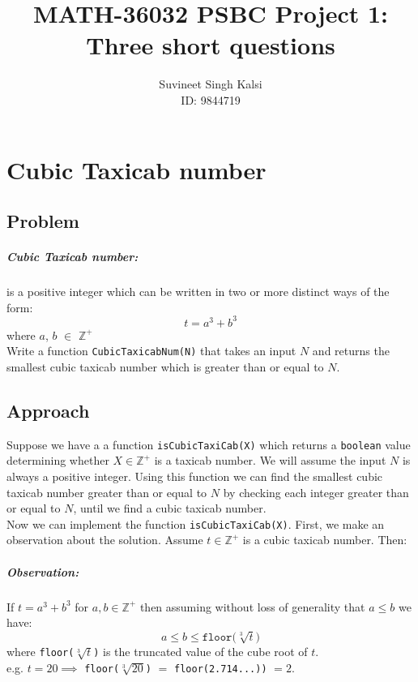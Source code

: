 \documentclass[11pt]{report}
\title{MATH-36032 PSBC Project 1: Three short questions}
\author{Suvineet Singh Kalsi \\ ID: 9844719}
\date{}
\begin{document}
\maketitle

\chapter{Cubic Taxicab number}

\section*{Problem}
\paragraph{Cubic Taxicab number:}
is a positive integer which can be written in two or more distinct ways of the form:
\begin{equation*}
	t = a^3 + b^3
\end{equation*} where $a$, $b$ $\in$ $\mathbb{Z^+}$ \\

Write a function \texttt{CubicTaxicabNum(N)} that takes an input $N$ and returns the smallest cubic taxicab number which is greater than or equal to $N$.

\section{Approach}
Suppose we have a a function \texttt{isCubicTaxiCab(X)} which returns a \texttt{boolean} value determining whether $X \in \mathbb{Z^+}$ is a taxicab number. We will assume the input $N$ is always a positive integer. Using this function we can find the smallest cubic taxicab number greater than or equal to $N$ by checking each integer greater than or equal to $N$, until we find a cubic taxicab number. \\



Now we can implement the function \texttt{isCubicTaxiCab(X)}. First, we make an observation about the solution. Assume $t \in \mathbb{Z^+}$ is a cubic taxicab number. Then:

\paragraph{Observation:}
If $t=a^3+b^3$ for $a, b \in \mathbb{Z^+}$ then assuming without loss of generality that $a \leqslant b$ we have:
\begin{equation*}
	a \leqslant b \leqslant \texttt{floor(}\sqrt[3]{t}\texttt{)} 
\end{equation*} where \texttt{floor($\sqrt[3]{t}$)} is the truncated value of the cube root of $t$. \\ 
e.g. $t=20 \implies$ \texttt{floor($\sqrt[3]{20}$)} $=$ \texttt{floor(2.714...))} $=2$. \\
\end{document}
